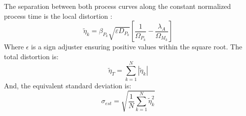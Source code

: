 The separation between both process curves along the constant normalized process time is the local distortion \cite{Martin2019}:
\begin{equation}
  \label{eq_15}
  \tilde{\eta}_{k}=\beta_{P_{k}}\sqrt{\varepsilon D_{P_{k}}}\left[\frac{1}{\Omega_{P_{k}}}-\frac{\lambda_{A}}{\Omega_{M_{k}}}\right]
\end{equation}
Where $\epsilon$ is a sign adjuster ensuring positive values within the square root. The total distortion is:
\begin{equation}
  \label{eq_16}
  \tilde{\eta}_{T}=\sum^{N}_{k=1}{\left|\tilde{\eta}_{k}\right|}
\end{equation}
And, the equivalent standard deviation is:
\begin{equation}
  \label{eq_17}
  \sigma_{est}=\sqrt{\frac{1}{N}\sum^{N}_{k=1}{\tilde{\eta}^{2}_{k}}}
\end{equation}

